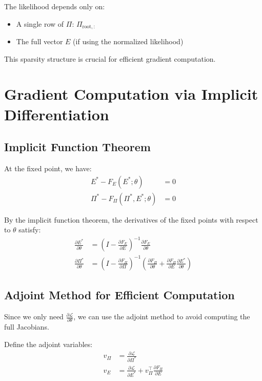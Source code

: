 \documentclass[11pt]{article}
\theoremstyle{definition}
\begin{document}
The likelihood depends only on:
\begin{itemize}
    \item A single row of $\Pi$: $\Pi_{\text{root},:}$
    \item The full vector $E$ (if using the normalized likelihood)
\end{itemize}

This sparsity structure is crucial for efficient gradient computation.

\section{Gradient Computation via Implicit Differentiation}

\subsection{Implicit Function Theorem}

At the fixed point, we have:
\begin{align}
    E^* - F_E(E^*; \theta) &= 0 \\
    \Pi^* - F_\Pi(\Pi^*, E^*; \theta) &= 0
\end{align}

By the implicit function theorem, the derivatives of the fixed points with respect to $\theta$ satisfy:
\begin{align}
    \frac{\partial E^*}{\partial \theta} &= (I - \frac{\partial F_E}{\partial E})^{-1} \frac{\partial F_E}{\partial \theta} \\
    \frac{\partial \Pi^*}{\partial \theta} &= (I - \frac{\partial F_\Pi}{\partial \Pi})^{-1} \left(\frac{\partial F_\Pi}{\partial \theta} + \frac{\partial F_\Pi}{\partial E} \frac{\partial E^*}{\partial \theta}\right)
\end{align}

\subsection{Adjoint Method for Efficient Computation}

Since we only need $\frac{\partial \mathcal{L}}{\partial \theta}$, we can use the adjoint method to avoid computing the full Jacobians.

Define the adjoint variables:
\begin{align}
    v_\Pi &= \frac{\partial \mathcal{L}}{\partial \Pi^*} \\
    v_E &= \frac{\partial \mathcal{L}}{\partial E^*} + v_\Pi^\top \frac{\partial F_\Pi}{\partial E}
\end{align}
\end{document}
